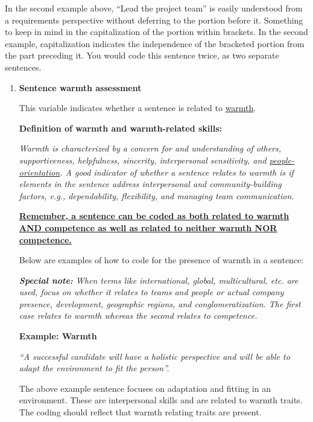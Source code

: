 \documentclass[Royal,sageapa,times]{sagej}
\begin{document}
\begin{enumerate}[label=\textbf{C\arabic*.}, wide=0pt, itemindent=0.25\textwidth]
\begin{adjustwidth}{0.75cm}{}
{        In the second example above, “Lead the project team” is easily understood from a requirements perspective without deferring to the portion before it. Something to keep in mind in the capitalization of the portion within brackets. In the second example, capitalization indicates the independence of the bracketed portion from the part preceding it. You would code this sentence twice, as two separate sentences.}
        \end{adjustwidth}
    \begin{enumerate}[label=\textbf{C\arabic{enumi}.\arabic*.}, wide=0pt]
        \item \noindent\textbf{Sentence warmth assessment}

        This variable indicates whether a sentence is related to \uline{warmth}.

        \noindent\textbf{Definition of warmth and warmth-related skills:}

        \textit{Warmth is characterized by a concern for and understanding of others, supportiveness, helpfulness, sincerity, interpersonal sensitivity, and \uline{people-orientation}. A good indicator of whether a sentence relates to warmth is if elements in the sentence address interpersonal and community-building factors, e.g., dependability, flexibility, and managing team communication.}

        \noindent\textbf{\uline{Remember, a sentence can be coded as both related to warmth AND competence as well as related to neither warmth NOR competence.}}

        \noindent Below are examples of how to code for the presence of warmth in a sentence:

        \noindent\textit{\textbf{Special note:} When terms like international, global, multicultural, etc. are used, focus on whether it relates to teams and people or actual company presence, development, geographic regions, and conglomeratization. The first case relates to warmth whereas the second relates to competence.}

        \noindent\textbf{\small Example: Warmth}

        \noindent\textit{\small “A successful candidate will have a holistic perspective and will be able to adapt the environment to fit the person”.}

        \begin{adjustwidth}{0.75cm}{}
            {\small The above example sentence focuses on adaptation and fitting in an environment. These are interpersonal skills and are related to warmth traits. The coding should reflect that warmth relating traits are present.}
            \end{adjustwidth}


\end{enumerate}
\end{enumerate}
\end{document}
